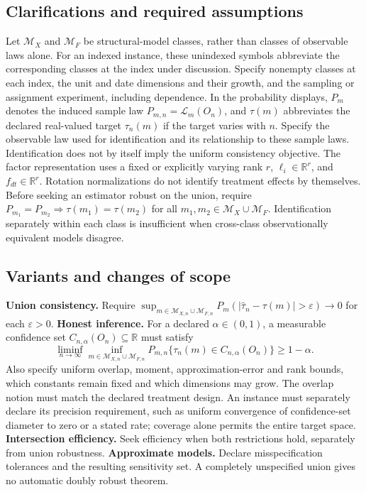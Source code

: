 \documentclass[11pt,a4paper]{article}
\begin{document}
\subsection*{Clarifications and required assumptions}

Let $\mathcal M_X$ and $\mathcal M_F$ be structural-model classes, rather than classes of observable laws alone. For an indexed instance, these unindexed symbols abbreviate the corresponding classes at the index under discussion. Specify nonempty classes at each index, the unit and date dimensions and their growth, and the sampling or assignment experiment, including dependence. In the probability displays, $P_m$ denotes the induced sample law $P_{m,n}=\mathcal L_m(O_n)$, and $\tau(m)$ abbreviates the declared real-valued target $\tau_n(m)$ if the target varies with $n$. Specify the observable law used for identification and its relationship to these sample laws. Identification does not by itself imply the uniform consistency objective. The factor representation uses a fixed or explicitly varying rank $r$, $\ell_i\in\mathbb R^r$, and $f_{dt}\in\mathbb R^r$. Rotation normalizations do not identify treatment effects by themselves. Before seeking an estimator robust on the union, require $P_{m_1}=P_{m_2}\Rightarrow\tau(m_1)=\tau(m_2)$ for all $m_1,m_2\in\mathcal M_X\cup\mathcal M_F$. Identification separately within each class is insufficient when cross-class observationally equivalent models disagree.

\subsection*{Variants and changes of scope}

\textbf{Union consistency.} Require $\sup_{m\in\mathcal M_{X,n}\cup\mathcal M_{F,n}}P_m(|\widehat\tau_n-\tau(m)|>\varepsilon)\to0$ for each $\varepsilon>0$. \textbf{Honest inference.} For a declared $\alpha\in(0,1)$, a measurable confidence set $C_{n,\alpha}(O_n)\subseteq\mathbb R$ must satisfy
\[
 \liminf_{n\to\infty}\inf_{m\in\mathcal M_{X,n}\cup\mathcal M_{F,n}}
 P_{m,n}\{\tau_n(m)\in C_{n,\alpha}(O_n)\}\geq1-\alpha.
\]
Also specify uniform overlap, moment, approximation-error and rank bounds, which constants remain fixed and which dimensions may grow. The overlap notion must match the declared treatment design. An instance must separately declare its precision requirement, such as uniform convergence of confidence-set diameter to zero or a stated rate; coverage alone permits the entire target space. \textbf{Intersection efficiency.} Seek efficiency when both restrictions hold, separately from union robustness. \textbf{Approximate models.} Declare misspecification tolerances and the resulting sensitivity set. A completely unspecified union gives no automatic doubly robust theorem.
\end{document}
